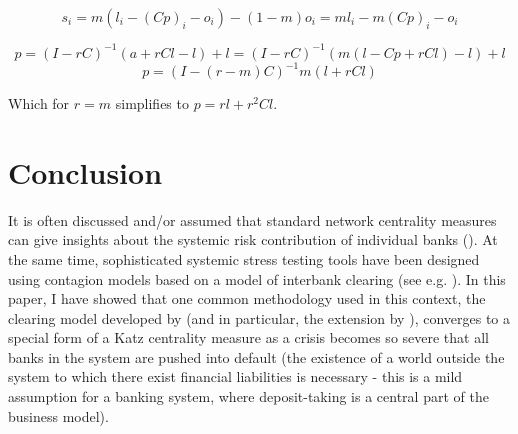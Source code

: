 \documentclass[authoryear,12pt]{elsarticle}
\begin{document}
\begin{equation}
s_i=m(l_i-(Cp)_i-o_i)-(1-m)o_i=ml_i-m(Cp)_i-o_i
\end{equation}

\[
p = (I - rC)^{-1} (a + rCl - l) + l = (I - rC)^{-1} (m(l-Cp+rCl) - l) + l
\]
\begin{equation}
p = (I - (r-m)C)^{-1}m(l+rCl) 
\end{equation}

Which for $r=m$ simplifies to $p = rl+r^2Cl$.



\section{Conclusion} \label{sec_Conclusion}

It is often discussed and/or assumed that standard network centrality measures can give insights about the systemic risk contribution of individual banks (\cite{Puhr2014}). At the same time, sophisticated systemic stress testing tools have been designed using contagion models based on a model of interbank clearing (see e.g. \cite{Elsinger2006}). In this paper, I have showed that one common methodology used in this context, the clearing model developed by \cite{Eisenberg2001} (and in particular, the extension by \cite{Rogers2013}), converges to a special form of a Katz centrality measure as a crisis becomes so severe that all banks in the system are pushed into default (the existence of a world outside the system to which there exist financial liabilities is necessary - this is a mild assumption for a banking system, where deposit-taking is a central part of the business model). 
\end{document}
